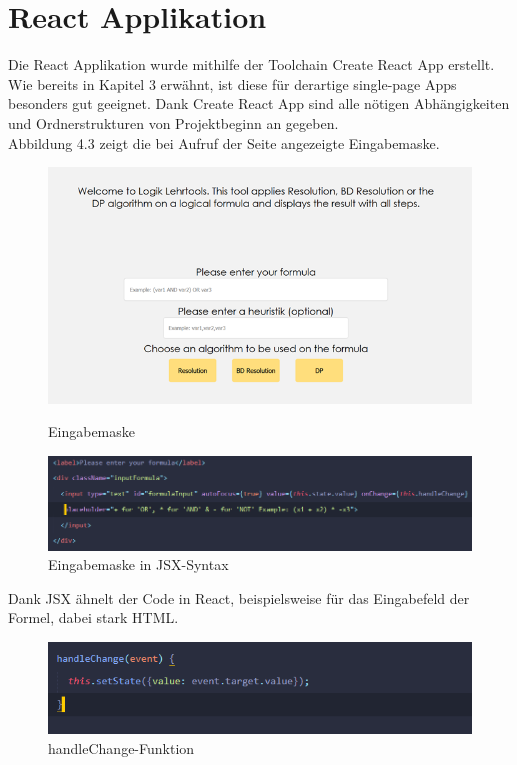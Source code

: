 \section{React Applikation}
Die React Applikation wurde mithilfe der Toolchain Create React App erstellt. Wie bereits in Kapitel 3 erwähnt, ist diese für derartige single-page Apps besonders gut geeignet. Dank Create React App sind alle nötigen Abhängigkeiten und Ordnerstrukturen von Projektbeginn an gegeben. \\
Abbildung 4.3 zeigt die bei Aufruf der Seite angezeigte Eingabemaske.\\
\begin{figure}[htb]
     \centerline{\includegraphics{../Abbildungen/eingabe.png}}
  \caption{Eingabemaske \cite{eig}}
  \label{fig1_1}
  \centerline{\includegraphics[width=14cm]{../Abbildungen/formulaInput.png}}
  \caption{Eingabemaske in JSX-Syntax \cite{eig}}
  \label{fig1_1}
\end{figure}
\noindent Dank JSX ähnelt der Code in React, beispielsweise für das Eingabefeld der Formel, dabei stark HTML.
\begin{figure}[htb]
  \centerline{\includegraphics[width=14cm]{../Abbildungen/handleChange.png}}
  \caption{handleChange-Funktion \cite{eig}}
  \label{fig1_1}
\end{figure}
